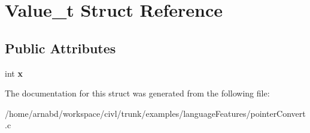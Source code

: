 \hypertarget{structValue__t}{}\section{Value\+\_\+t Struct Reference}
\label{structValue__t}
\subsection*{Public Attributes}
\begin{DoxyCompactItemize}
\item 
\hypertarget{structValue__t_aafcb39eebd4539da8712b26bd49aa3c9}{}int {\bfseries x}\label{structValue__t_aafcb39eebd4539da8712b26bd49aa3c9}

\end{DoxyCompactItemize}


The documentation for this struct was generated from the following file\+:\begin{DoxyCompactItemize}
\item 
/home/arnabd/workspace/civl/trunk/examples/language\+Features/pointer\+Convert.\+c\end{DoxyCompactItemize}
